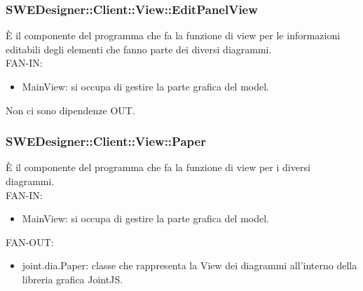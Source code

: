 \documentclass[../PianoDiQualifica.tex]{subfiles}
\begin{document}
		\subsubsection{SWEDesigner::Client::View::EditPanelView}
		È il componente del programma che fa la funzione di view per le informazioni editabili degli elementi che fanno parte dei diversi diagrammi.\\
		FAN-IN:
		\begin{itemize}
			\item MainView: si occupa di gestire la parte grafica del model.
		\end{itemize}
		Non ci sono dipendenze OUT.\\
		\subsubsection{SWEDesigner::Client::View::Paper}
		È il componente del programma che fa la funzione di view per i diversi diagrammi.\\
		FAN-IN:
		\begin{itemize}
			\item MainView: si occupa di gestire la parte grafica del model.
		\end{itemize}
		FAN-OUT:
		\begin{itemize}
			\item joint.dia.Paper: classe che rappresenta la View dei diagrammi all'interno della libreria grafica JointJS.
		\end{itemize}
\end{document}
